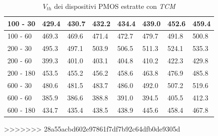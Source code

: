 \documentclass[12pt, letterpaper]{book}
\begin{document}
\begin{table}[H]
\begin{tabular}{m{2cm} m{0.8cm} m{1.1cm} m{1.3cm} m{1.5cm} m{1.5cm} m{1.5cm} m{1cm}}
    \midrule
    100 - 30                     & 429.4                              & 430.7   & 432.2    & 434.4     & 439.0     & 452.6     & 459.4   \\
    \hline
    100 - 60                     & 469.3                              & 469.6   & 471.4    & 472.7     & 479.7     & 491.8     & 500.8   \\
    \hline
    200 - 30                     & 495.3                              & 497.1   & 503.9    & 506.5     & 511.3     & 524.1     & 535.3   \\
    \hline
    200 - 60                     & 399.3                              & 401.0   & 403.1    & 404.8     & 410.2     & 422.3     & 429.8   \\
    \hline
    200 - 180                    & 453.5                              & 455.2   & 456.2    & 458.6     & 463.8     & 476.9     & 485.8   \\
    \hline
    600 - 30                     & 480.6                              & 481.5   & 483.7    & 486.0     & 492.0     & 507.2     & 519.6   \\
    \hline
    600 - 60                     & 385.9                              & 386.6   & 388.8    & 391.0     & 394.5     & 405.5     & 412.3   \\
    \hline
    600 - 180                    & 434.7                              & 435.4   & 438.5    & 438.9     & 445.6     & 458.4     & 467.8   \\
    \bottomrule
  \end{tabular}
>>>>>>> 28a55acbd602e97861f7df7b92c64dfb0de9305d
  \caption{$V_{th}$ dei dispositivi PMOS estratte con \emph{TCM}}
  \label{tab:VthTCMP}
\end{table}
\end{document}
